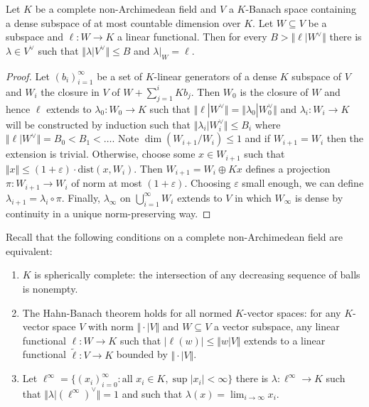 \begin{proposition}\label{prop: restriction of bounded functionals}
    Let $K$ be a complete non-Archimedean field and $V$ a $K$-Banach space containing a dense subspace of at most countable dimension over $K$. Let $W\subseteq V$ be a subspace and $\ell:W\to K$ a linear functional. Then for every $B>\Vert \ell|W^{\vee}\Vert$ there is $\lambda\in V^{\vee}$ such that $\Vert\lambda|V^{\vee}\Vert\leq B$ and $\lambda|_{W}=\ell$. 
\end{proposition}
\begin{proof}
    Let $(b_{i})_{i=1}^{\infty}$ be a set of $K$-linear generators of a dense $K$ subspace of $V$ and $W_{i}$ the closure in $V$ of $W+\sum_{j=1}^{i}K b_{j}$. Then $W_{0}$ is the closure of $W$ and hence $\ell$ extends to $\lambda_{0}:W_{0}\to K$ such that $\Vert\ell|W^{\vee}\Vert=\Vert\lambda_{0}|W_{0}^{\vee}\Vert$ and $\lambda_{i}:W_{i}\to K$ will be constructed by induction such that $\Vert\lambda_{i}|W_{i}^{\vee}\Vert\leq B_{i}$ where $\Vert\ell|W^{\vee}\Vert=B_{0}<B_{1}<\dots$. Note $\dim(W_{i+1}/W_{i})\leq 1$ and if $W_{i+1}=W_{i}$ then the extension is trivial. Otherwise, choose some $x\in W_{i+1}$ such that $\Vert x\Vert\leq (1+\varepsilon)\cdot\mathrm{dist}(x,W_{i})$. Then $W_{i+1}=W_{i}\oplus Kx$ defines a projection $\pi:W_{i+1}\to W_{i}$ of norm at most $(1+\varepsilon)$. Choosing $\varepsilon$ small enough, we can define $\lambda_{i+1}=\lambda_{i}\circ\pi$. Finally, $\lambda_{\infty}$ on $\bigcup_{i=1}^{\infty}W_{i}$ extends to $V$ in which $W_{\infty}$ is dense by continuity in a unique norm-preserving way. 
\end{proof}
\begin{remark}
    Recall that the following conditions on a complete non-Archimedean field are equivalent: 
    \begin{enumerate}[label=(\roman*)]
        \item $K$ is spherically complete: the intersection of any decreasing sequence of balls is nonempty. 
        \item The Hahn-Banach theorem holds for all normed $K$-vector spaces: for any $K$-vector space $V$ with norm $\Vert\cdot|V\Vert$ and $W\subseteq V$ a vector subspace, any linear functional $\ell:W\to K$ such that $|\ell(w)|\leq\Vert w|V\Vert$ extends to a linear functional $\widetilde{\ell}:V\to K$ bounded by $\Vert\cdot|V\Vert$. 
        \item Let $\ell^{\infty}=\{(x_{i})_{i=0}^{\infty}:\text{all }x_{i}\in K, \sup|x_{i}|<\infty\}$ there is $\lambda:\ell^{\infty}\to K$ such that $\Vert\lambda|(\ell^{\infty})^{\vee}\Vert=1$ and such that $\lambda(x)=\lim_{i\to\infty}x_{i}$. 
    \end{enumerate}
\end{remark}
